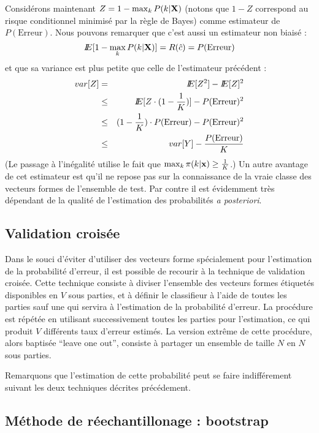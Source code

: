 Consid\'erons maintenant $Z=1-\max_k P(k | \mbox{\bf X})$ 
(notons que $1-Z$ correspond au risque conditionnel
minimis\'e par la r\`egle de Bayes) comme estimateur de $P(\mbox{Erreur})$. Nous
pouvons remarquer que c'est aussi un estimateur non biais\'e :
$$
I\!\!E[1-\max_k P(k | \mbox{\bf X})]=R(\hat{c})=P(\mbox{Erreur})
$$
et que sa variance est plus petite que celle de l'estimateur pr\'ec\'edent :
\begin{eqnarray*}
var[Z] & =    &  I\!\!E[Z^2]-I\!\!E[Z]^2 \\
        & \leq &  I\!\!E[Z \cdot (1-\frac{1}{K})]-P(\mbox{Erreur})^2 \\
        & \leq & (1-\frac{1}{K}) \cdot  P(\mbox{Erreur})-P(\mbox{Erreur})^2\\
        & \leq & var[Y]-\frac{P(\mbox{Erreur})}{K}
\end{eqnarray*}
(Le passage \`a l'in\'egalit\'e utilise le fait que $\max_k \pi(k | \mbox{\bf x}) \geq \frac{1}{K}$.)
Un autre avantage de cet estimateur est qu'il ne repose pas sur la connaissance 
de la vraie classe des vecteurs formes de l'ensemble de test. Par contre il 
est \'evidemment tr\`es d\'ependant de la qualit\'e de l'estimation des
probabilit\'es {\em a posteriori}. 

\subsection{Validation crois\'ee}

Dans le souci d'\'eviter d'utiliser des vecteurs forme 
sp\'ecialement pour l'estimation de
la probabilit\'e d'erreur, il est possible de recourir \`a la technique de 
validation crois\'ee. Cette technique consiste \`a diviser l'ensemble 
des vecteurs formes \'etiquet\'es disponibles en $V$ sous parties, et \`a
d\'efinir le classifieur \`a l'aide de  toutes les parties sauf une qui servira
\`a l'estimation de la probabilit\'e d'erreur. La proc\'edure est r\'ep\'et\'ee
en utilisant successivement toutes les parties pour l'estimation, ce qui
produit $V$ diff\'erents taux d'erreur estim\'es. La version extr\^eme de 
cette proc\'edure, alors baptis\'ee ``leave one out'', consiste \`a partager un 
ensemble de taille $N$ en $N$ sous parties.  

Remarquons que l'estimation
de cette probabilit\'e peut se faire indiff\'erement suivant les deux 
techniques d\'ecrites pr\'ec\'edement.  


\subsection{M\'ethode de r\'eechantillonage : bootstrap}

